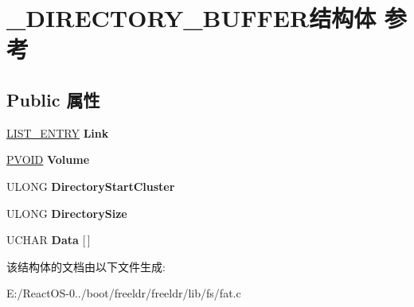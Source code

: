 \hypertarget{struct___d_i_r_e_c_t_o_r_y___b_u_f_f_e_r}{}\section{\+\_\+\+D\+I\+R\+E\+C\+T\+O\+R\+Y\+\_\+\+B\+U\+F\+F\+E\+R结构体 参考}
\label{struct___d_i_r_e_c_t_o_r_y___b_u_f_f_e_r}
\subsection*{Public 属性}
\begin{DoxyCompactItemize}
\item 
\mbox{\label{struct___d_i_r_e_c_t_o_r_y___b_u_f_f_e_r_a108fdd88819a0ad63225b88ecec5c12c}} 
\hyperlink{struct___l_i_s_t___e_n_t_r_y}{L\+I\+S\+T\+\_\+\+E\+N\+T\+RY} {\bfseries Link}
\item 
\mbox{\label{struct___d_i_r_e_c_t_o_r_y___b_u_f_f_e_r_a15adfbe8c29a3a1dea8bc3c80dd82e82}} 
\hyperlink{interfacevoid}{P\+V\+O\+ID} {\bfseries Volume}
\item 
\mbox{\label{struct___d_i_r_e_c_t_o_r_y___b_u_f_f_e_r_af545ef9359e6392525dddf8e34e4793a}} 
U\+L\+O\+NG {\bfseries Directory\+Start\+Cluster}
\item 
\mbox{\label{struct___d_i_r_e_c_t_o_r_y___b_u_f_f_e_r_ac55dee204af5819f2cf099435b13faf6}} 
U\+L\+O\+NG {\bfseries Directory\+Size}
\item 
\mbox{\label{struct___d_i_r_e_c_t_o_r_y___b_u_f_f_e_r_afbb77e3d2bd8bbe0fab0190227b79111}} 
U\+C\+H\+AR {\bfseries Data} \mbox{[}$\,$\mbox{]}
\end{DoxyCompactItemize}


该结构体的文档由以下文件生成\+:\begin{DoxyCompactItemize}
\item 
E\+:/\+React\+O\+S-\/0../boot/freeldr/freeldr/lib/fs/fat.\+c\end{DoxyCompactItemize}
